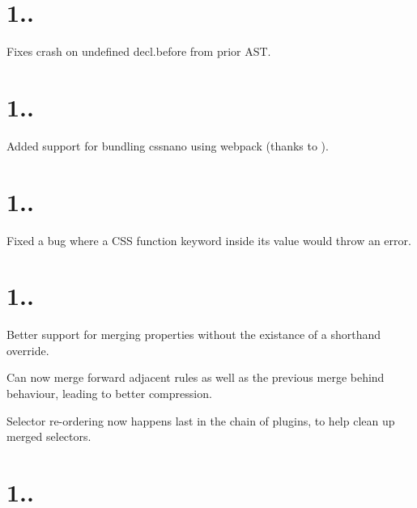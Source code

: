 \section*{1..}


\begin{DoxyItemize}
\item Fixes crash on undefined {\ttfamily decl.\+before} from prior A\+ST.
\end{DoxyItemize}

\section*{1..}


\begin{DoxyItemize}
\item Added support for bundling cssnano using webpack (thanks to ).
\end{DoxyItemize}

\section*{1..}


\begin{DoxyItemize}
\item Fixed a bug where a C\+SS function keyword inside its value would throw an error.
\end{DoxyItemize}

\section*{1..}


\begin{DoxyItemize}
\item Better support for merging properties without the existance of a shorthand override.
\item Can now \textquotesingle{}merge forward\textquotesingle{} adjacent rules as well as the previous \textquotesingle{}merge behind\textquotesingle{} behaviour, leading to better compression.
\item Selector re-\/ordering now happens last in the chain of plugins, to help clean up merged selectors.
\end{DoxyItemize}

\section*{1..}


